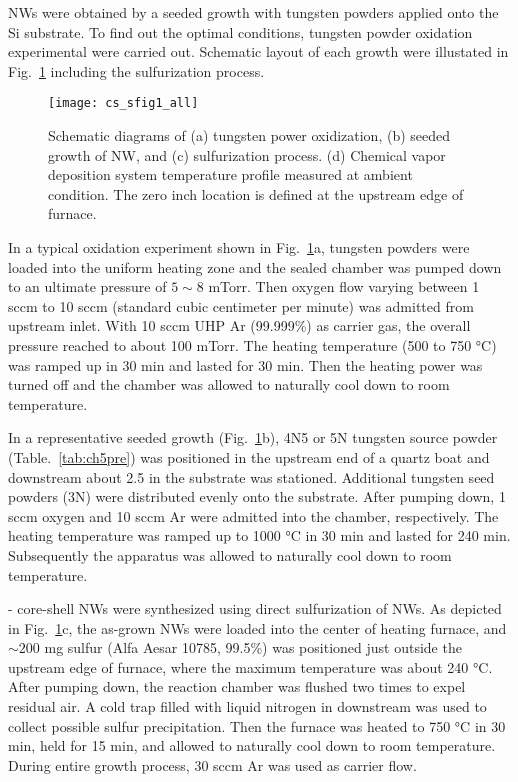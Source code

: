  NWs were obtained by a seeded growth with tungsten powders applied onto the Si substrate. To find out the optimal conditions, tungsten powder oxidation experimental were carried out. Schematic layout of each growth were illustated in Fig.~\ref{fig:ch5grow} including the sulfurization process.   

\begin{figure}[htb]
\centering
\texttt{[image: cs\_sfig1\_all]}
\caption[ NW growth: OT]{Schematic diagrams of (a) tungsten power oxidization, (b) seeded growth of  NW, and (c) sulfurization process. (d) Chemical vapor deposition system temperature profile measured at ambient condition. The zero inch location is defined at the upstream edge of furnace.}
\label{fig:ch5grow}
\end{figure}

In a typical oxidation experiment shown in Fig.~\ref{fig:ch5grow}a, tungsten powders were loaded into the uniform heating zone and the sealed chamber was pumped down to an ultimate pressure of $5\sim8$ mTorr. Then oxygen flow varying between 1 sccm to 10 sccm (standard cubic centimeter per minute) was admitted from upstream inlet. With 10 sccm UHP Ar (99.999\%) as carrier gas, the overall pressure reached to about 100 mTorr. The heating temperature (500 to 750 \si{\degreeCelsius}) was ramped up in 30 min and lasted for 30 min. Then the heating power was turned off and the chamber was allowed to naturally cool down to room temperature.

In a representative seeded growth (Fig.~\ref{fig:ch5grow}b), 4N5 or 5N tungsten source powder (Table.~\ref{tab:ch5pre}) was positioned in the upstream end of a quartz boat and downstream about 2.5 in the substrate was stationed. Additional tungsten seed powders (3N) were distributed evenly onto the substrate. After pumping down, 1 sccm oxygen and 10 sccm Ar were admitted into the chamber, respectively. The heating temperature was ramped up to 1000 \si{\degreeCelsius} in 30 min and lasted for 240 min. Subsequently the apparatus was allowed to naturally cool down to room temperature. 

- core-shell NWs were synthesized using direct sulfurization of  NWs. As depicted in Fig.~\ref{fig:ch5grow}c, the as-grown  NWs were loaded into the center of heating furnace, and $\sim200$ mg sulfur (Alfa Aesar 10785, 99.5\%) was positioned just outside the upstream edge of furnace, where the maximum temperature was about 240 \si{\degreeCelsius}. After pumping down, the reaction chamber was flushed two times to expel residual air. A cold trap filled with liquid nitrogen in downstream was used to collect possible sulfur precipitation. Then the furnace was heated to 750 \si{\degreeCelsius} in 30 min, held for 15 min, and allowed to naturally cool down to room temperature. During entire growth process, 30 sccm Ar was used as carrier flow.


